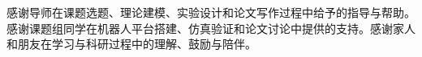 
\begin{acknowledgements}
感谢导师在课题选题、理论建模、实验设计和论文写作过程中给予的指导与帮助。感谢课题组同学在机器人平台搭建、仿真验证和论文讨论中提供的支持。感谢家人和朋友在学习与科研过程中的理解、鼓励与陪伴。
\end{acknowledgements}
